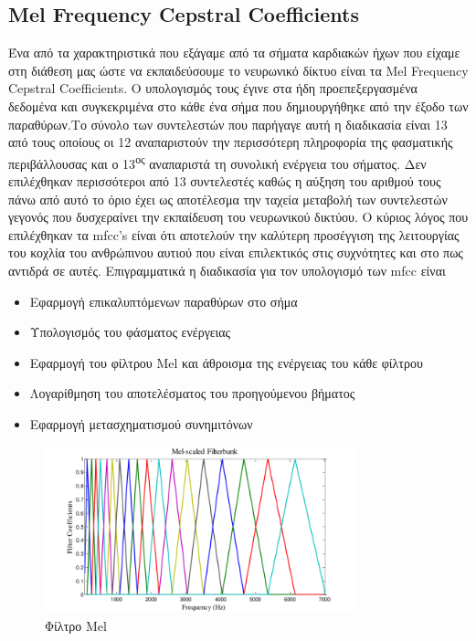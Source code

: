 \documentclass[../main.tex]{subfiles}
\begin{document}
\subsection{Mel Frequency Cepstral Coefficients}

Ένα από τα χαρακτηριστικά που εξάγαμε από τα σήματα καρδιακών ήχων που είχαμε
στη διάθεση μας ώστε να εκπαιδεύσουμε το νευρωνικό δίκτυο είναι τα Mel Frequency
Cepstral Coefficients. Ο υπολογισμός τους έγινε στα ήδη προεπεξεργασμένα
δεδομένα και συγκεκριμένα στο κάθε ένα σήμα που δημιουργήθηκε από την έξοδο των
παραθύρων.Το σύνολο των συντελεστών που παρήγαγε αυτή η διαδικασία είναι 13 από
τους οποίους οι 12 αναπαριστούν την περισσότερη πληροφορία της φασματικής
περιβάλλουσας και ο 13\textsuperscript{ος} αναπαριστά τη συνολική ενέργεια του
σήματος. Δεν επιλέχθηκαν περισσότεροι από 13 συντελεστές καθώς η αύξηση του
αριθμού τους πάνω από αυτό το όριο έχει ως αποτέλεσμα την ταχεία μεταβολή των
συντελεστών γεγονός που δυσχεραίνει την εκπαίδευση του νευρωνικού δικτύου. Ο
κύριος λόγος που επιλέχθηκαν τα mfcc's είναι ότι αποτελούν την καλύτερη
προσέγγιση της λειτουργίας του κοχλία του ανθρώπινου αυτιού που είναι
επιλεκτικός στις συχνότητες και στο πως αντιδρά σε αυτές. Επιγραμματικά η
διαδικασία για τον υπολογισμό των mfcc είναι \cite{mfcc}

\begin{itemize}
	\item Εφαρμογή επικαλυπτόμενων παραθύρων στο σήμα
	\item Υπολογισμός του φάσματος ενέργειας
	\item Εφαρμογή του φίλτρου Mel και άθροισμα της ενέργειας του κάθε φίλτρου
	\item Λογαρίθμηση του αποτελέσματος του προηγούμενου βήματος
	\item Εφαρμογή μετασχηματισμού συνημιτόνων
\end{itemize}

\begin{figure}[H]
	\center
	\includegraphics[width=0.8\textwidth]{images/MelFilter.png}
	\caption{Φίλτρο Mel}
	\label{melfilter}
\end{figure}
\end{document}
